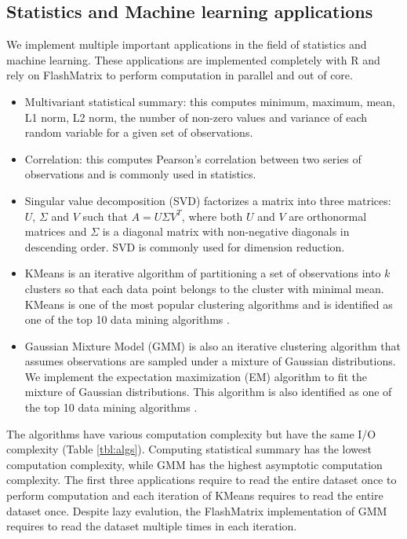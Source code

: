 \subsection{Statistics and Machine learning applications} \label{sec:apps}
We implement multiple important applications in the field of statistics and
machine learning. These applications are implemented completely with R and
rely on FlashMatrix to perform computation in parallel and out of core.
\begin{itemize}
	\item Multivariant statistical summary: this computes minimum, maximum,
		mean, L1 norm, L2 norm, the number of non-zero values
		and variance of each random variable for a given set of observations.
	\item Correlation: this computes Pearson's correlation \cite{} between
		two series of observations and is commonly used in statistics.
	\item Singular value decomposition (SVD) \cite{} factorizes a matrix into
		three matrices: $U$, $\Sigma$ and $V$ such that $A=U \Sigma V^T$, where
		both $U$ and $V$ are orthonormal matrices and $\Sigma$ is a diagonal
		matrix with non-negative diagonals in descending order. SVD is commonly
		used for dimension reduction.
	\item KMeans \cite{kmeans} is an iterative algorithm of partitioning a set
		of observations into $k$ clusters
		so that each data point belongs to the cluster with minimal mean. KMeans
		is one of the most popular clustering algorithms and is identified as
		one of the top 10 data mining algorithms \cite{top10}.
	\item Gaussian Mixture Model (GMM) \cite{gmm} is also an iterative
		clustering algorithm that assumes observations are sampled under
		a mixture of Gaussian distributions. We implement the expectation
		maximization (EM) \cite{gmm} algorithm to fit
		the mixture of Gaussian distributions. This algorithm is also identified
		as one of the top 10 data mining algorithms \cite{top10}.
\end{itemize}

The algorithms have various computation complexity but have the same I/O
complexity (Table \ref{tbl:algs}). Computing statistical summary
has the lowest computation complexity, while GMM has the highest asymptotic
computation complexity. The first three applications require to read the entire
dataset once to perform computation and each iteration of KMeans requires to
read the entire dataset once. Despite lazy evalution, the FlashMatrix
implementation of GMM requires to read the dataset multiple times in each
iteration.

